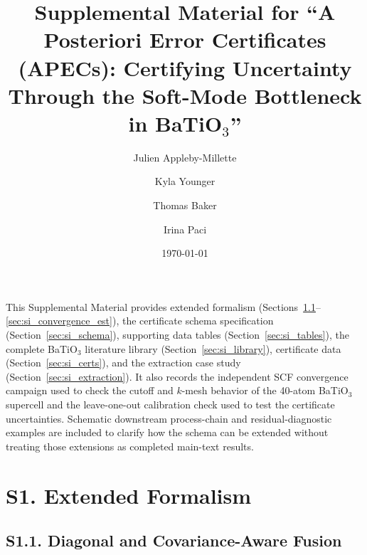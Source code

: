 \documentclass[onecolumn,superscriptaddress,amsmath,amssymb,longbibliography]{revtex4-2}
\begin{document}
\title{Supplemental Material for ``A Posteriori Error Certificates (APECs): Certifying Uncertainty Through the Soft-Mode Bottleneck in BaTiO$_3$''}

\author{Julien Appleby-Millette}
\author{Kyla Younger}
\author{Thomas Baker}
\author{Irina Paci}

\date{\today}

\maketitle

This Supplemental Material provides extended formalism
(Sections~\ref{sec:si_covariance}--\ref{sec:si_convergence_est}), the
certificate schema specification (Section~\ref{sec:si_schema}), supporting
data tables (Section~\ref{sec:si_tables}), the complete BaTiO$_3$ literature
library (Section~\ref{sec:si_library}), certificate data
(Section~\ref{sec:si_certs}), and the extraction case study
(Section~\ref{sec:si_extraction}). It also records the independent SCF
convergence campaign used to check the cutoff and $k$-mesh behavior of the
40-atom BaTiO$_3$ supercell and the leave-one-out calibration check used to
test the certificate uncertainties. Schematic downstream process-chain and
residual-diagnostic examples are included to clarify how the schema can be
extended without treating those extensions as completed main-text results.

\section{S1. Extended Formalism}

\subsection{S1.1. Diagonal and Covariance-Aware Fusion}
\label{sec:si_covariance}
\end{document}
